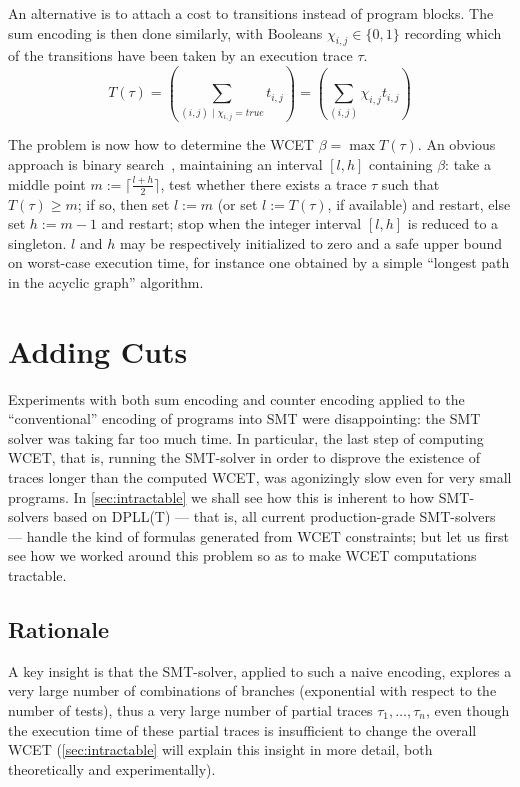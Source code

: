 \documentclass[a4paper,twocolumn,11pt]{article}
\newcommand\true{\mathit{true}}
\begin{document}
An alternative is to attach a cost to transitions instead of program blocks. The sum encoding is then done similarly, with Booleans $\chi_{i,j} \in \{0,1\}$ recording which of the transitions have been taken by an execution trace $\tau$.
\begin{equation}\label{eqn:sum_encoding_edges}
T(\tau) = \left( \sum_{(i,j) \mid \chi_{i,j}=\true} t_{i,j} \right)
        = \left( \sum_{(i,j)} \chi_{i,j} t_{i,j} \right)
\end{equation}

The problem is now how to determine the WCET $\beta = \max T(\tau)$. An obvious approach is binary search~\parencite{Sebastiani_Tomasi_IJCAR12}, maintaining an interval $[l,h]$ containing $\beta$: take a middle point $m:=\lceil\frac{l+h}{2}\rceil$, test whether there exists a trace $\tau$ such that $T(\tau) \geq m$; if so, then set $l:=m$ (or set $l:=T(\tau)$, if available) and restart, else set $h:=m-1$ and restart; stop when the integer interval $[l,h]$ is reduced to a singleton. $l$ and $h$ may be respectively initialized to zero and a safe upper bound on worst-case execution time, for instance one obtained by a simple ``longest path in the acyclic graph'' algorithm.

\section{Adding Cuts}
\label{sec:cuts}
Experiments with both sum encoding and counter encoding applied to the ``conventional'' encoding of programs into SMT were disappointing: the SMT solver was taking far too much time. In particular, the last step of computing WCET, that is, running the SMT-solver in order to disprove the existence of traces longer than the computed WCET, was agonizingly slow even for very small programs.
In \autoref{sec:intractable} we shall see how this is inherent to how SMT-solvers based on DPLL(T) --- that is, all current production-grade SMT-solvers --- handle the kind of formulas generated from WCET constraints; but let us first see how we worked around this problem so as to make WCET computations tractable.

\subsection{Rationale}
A key insight is that the SMT-solver, applied to such a naive encoding, explores a very large number of combinations of branches (exponential with respect to the number of tests), thus a very large number of partial traces $\tau_1, \dots, \tau_n$, even though the execution time of these partial traces is insufficient to change the overall WCET (\autoref{sec:intractable} will explain this insight in more detail, both theoretically and experimentally).
\end{document}
